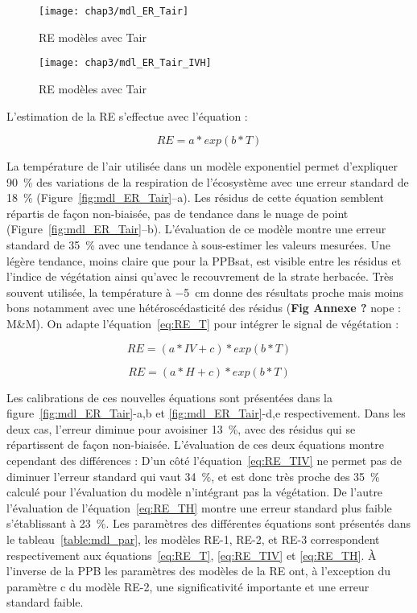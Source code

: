 \begin{figure}[p]
\centering
\texttt{[image: chap3/mdl\_ER\_Tair]}
\caption{\label{fig:mdl_ER_Tair}RE modèles avec Tair}
\texttt{[image: chap3/mdl\_ER\_Tair\_IVH]}
\caption{\label{fig:ER_mdl_TairIVH}RE modèles avec Tair}
\end{figure}

L'estimation de la RE s'effectue avec l'équation :

\begin{equation} \label{eq:RE_T}
RE = a*exp(b*T)
\end{equation}

La température de l'air utilisée dans un modèle exponentiel permet d'expliquer \SI{90}{\percent} des variations de la respiration de l'écosystème avec une erreur standard de \SI{18}{\percent} (Figure~\ref{fig:mdl_ER_Tair}--a).
Les résidus de cette équation semblent répartis de façon non-biaisée, pas de tendance dans le nuage de point (Figure~\ref{fig:mdl_ER_Tair}--b).
L'évaluation de ce modèle montre une erreur standard de \SI{35}{\percent} avec une tendance à sous-estimer les valeurs mesurées.
Une légère tendance, moins claire que pour la PPBsat, est visible entre les résidus et l'indice de végétation ainsi qu'avec le recouvrement de la strate herbacée.
Très souvent utilisée, la température à \SI{-5}{\centi\metre} donne des résultats proche mais moins bons notamment avec une hétéroscédasticité des résidus (\textbf{Fig Annexe ?} nope : M\&M).
On adapte l'équation~\ref{eq:RE_T} pour intégrer le signal de végétation :

\begin{equation} \label{eq:RE_TIV}
RE = (a*IV + c)*exp(b*T)
\end{equation}

\begin{equation} \label{eq:RE_TH}
RE = (a*H + c)*exp(b*T)
\end{equation}

Les calibrations de ces nouvelles équations sont présentées dans la figure~\ref{fig:mdl_ER_Tair}-a,b et \ref{fig:mdl_ER_Tair}-d,e respectivement.
Dans les deux cas, l'erreur diminue pour avoisiner \SI{13}{\percent}, avec des résidus qui se répartissent de façon non-biaisée.
L'évaluation de ces deux équations montre cependant des différences :
D'un côté l'équation~\ref{eq:RE_TIV} ne permet pas de diminuer l'erreur standard qui vaut \SI{34}{\percent}, et est donc très proche des \SI{35}{\percent} calculé pour l'évaluation du modèle n'intégrant pas la végétation.
De l'autre l'évaluation de l'équation~\ref{eq:RE_TH} montre une erreur standard plus faible s'établissant à \SI{23}{\percent}.
Les paramètres des différentes équations sont présentés dans le tableau~\ref{table:mdl_par}, les modèles RE-1, RE-2, et RE-3 correspondent respectivement aux équations~\ref{eq:RE_T}, \ref{eq:RE_TIV} et \ref{eq:RE_TH}.
À l'inverse de la PPB les paramètres des modèles de la RE ont, à l'exception du paramètre c du modèle RE-2, une significativité importante et une erreur standard faible.



